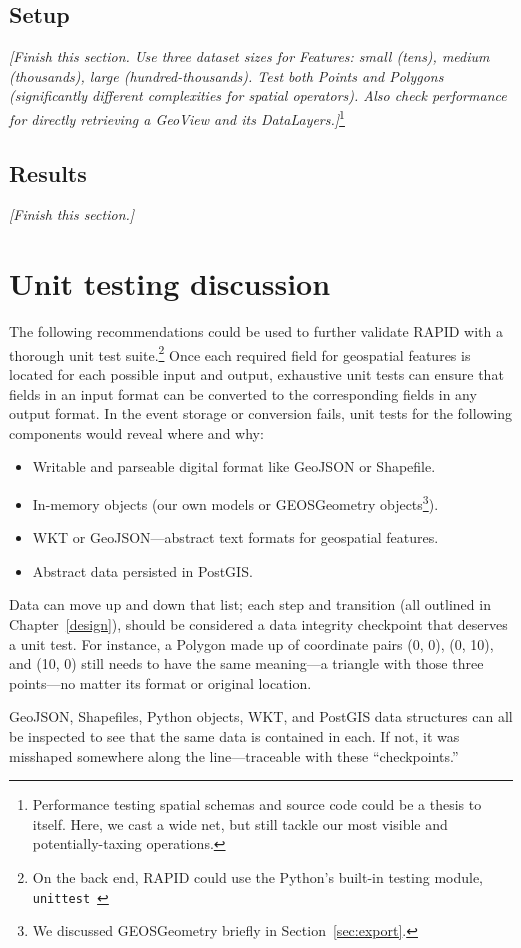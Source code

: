 \subsection{Setup}
\textit{[Finish this section. Use three dataset sizes for Features: small (tens), medium (thousands), large (hundred-thousands). Test both Points and Polygons (significantly different complexities for spatial operators). Also check performance for directly retrieving a GeoView and its DataLayers.]}\footnote{Performance testing spatial schemas and source code could be a thesis to itself. Here, we cast a wide net, but still tackle our most visible and potentially-taxing operations.}


\subsection{Results}
\textit{[Finish this section.]}

\section{Unit testing discussion}
The following recommendations could be used to further validate RAPID with a thorough unit test suite.\footnote{On the back end, RAPID could use the Python's built-in testing module, \texttt{unittest}~\cite{DjangoTesting}} Once each required field for geospatial features is located for each possible input and output, exhaustive unit tests can ensure that fields in an input format can be converted to the corresponding fields in any output format. In the event storage or conversion fails, unit tests for the following components would reveal where and why:

\begin{itemize}
\item Writable and parseable digital format like GeoJSON or Shapefile.
\item In-memory objects (our own models or GEOSGeometry objects\footnote{We discussed GEOSGeometry briefly in Section~\ref{sec:export}.}).
\item WKT or GeoJSON---abstract text formats for geospatial features.
\item Abstract data persisted in PostGIS.
\end{itemize}

Data can move up and down that list; each step and transition (all outlined in Chapter~\ref{design}), should be considered a data integrity checkpoint that deserves a unit test. For instance, a Polygon made up of coordinate pairs (0, 0), (0, 10), and (10, 0) still needs to have the same meaning---a triangle with those three points---no matter its format or original location.

GeoJSON, Shapefiles, Python objects, WKT, and PostGIS data structures can all be inspected to see that the same data is contained in each. If not, it was misshaped somewhere along the line---traceable with these ``checkpoints.''
